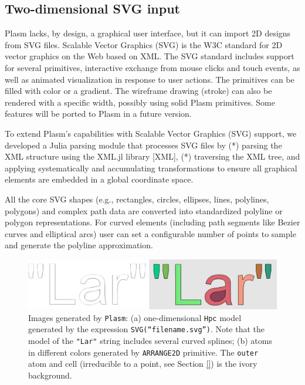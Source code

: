 \documentclass{juliacon}
\begin{document}
\subsection{Two-dimensional SVG input}
\label{subsec:title_auth}

Plasm lacks, by design, a graphical user interface, but it can import 2D designs from SVG files. Scalable Vector Graphics (SVG) is the W3C standard for 2D vector graphics on the Web based on XML.  The SVG standard includes support for several primitives, interactive exchange from mouse clicks and touch events, as well as animated visualization in response to user actions. The primitives can be filled with color or a gradient. The wireframe drawing (stroke) can also be rendered with a specific width, possibly using solid Plasm primitives. Some features will be ported to Plasm in a future version. 

To extend Plasm's capabilities with Scalable Vector Graphics (SVG) support, we developed a Julia parsing module that processes SVG files by (*) parsing the XML structure using the XML.jl library [XML], (*) traversing the XML tree, and applying systematically and accumulating transformations to ensure all graphical elements are embedded in a global coordinate space.

All the core SVG shapes (e.g., rectangles, circles, ellipses, lines, polylines, polygons) and complex path data are converted into standardized polyline or polygon representations. For curved elements (including path segments like Bezier curves and elliptical arcs) user can set a configurable number of points to sample and generate the polyline approximation.

\begin{figure}[htbp]
	\label{fig:7:2:svg2}
    \includegraphics[width=\linewidth]{figs/two-Lar.pdf}
    \caption{Images generated by {\tt Plasm}: (a) one-dimensional {\tt Hpc} model generated by the expression {\tt SVG(“filename.svg”)}. Note that the model of the {\tt "Lar"} string includes several curved splines; (b) atoms in different colors generated by {\tt ARRANGE2D} primitive. The {\tt outer} atom and cell (irreducible to a point, see Section \ref{}) is the ivory background.}
\end{figure}
\end{document}

